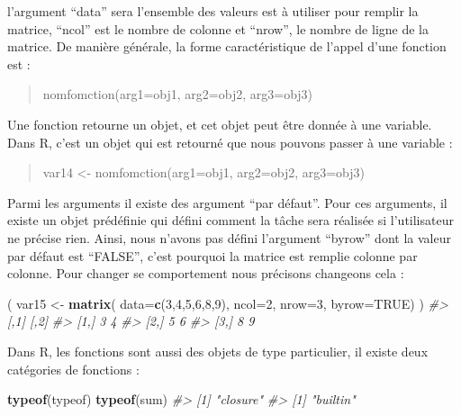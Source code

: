 \documentclass[]{article}
\newenvironment{Shaded}{\begin{snugshade}}{\end{snugshade}}
\newcommand{\CommentTok}[1]{\textcolor[rgb]{0.56,0.35,0.01}{\textit{#1}}}
\newcommand{\DataTypeTok}[1]{\textcolor[rgb]{0.13,0.29,0.53}{#1}}
\newcommand{\DecValTok}[1]{\textcolor[rgb]{0.00,0.00,0.81}{#1}}
\newcommand{\KeywordTok}[1]{\textcolor[rgb]{0.13,0.29,0.53}{\textbf{#1}}}
\newcommand{\NormalTok}[1]{#1}
\newcommand{\OtherTok}[1]{\textcolor[rgb]{0.56,0.35,0.01}{#1}}
\newcommand{\StringTok}[1]{\textcolor[rgb]{0.31,0.60,0.02}{#1}}
\begin{document}
l'argument ``data'' sera l'ensemble des valeurs est à utiliser pour remplir la matrice, ``ncol'' est le nombre de colonne et ``nrow'', le nombre de ligne de la matrice. De manière générale, la forme caractéristique de l'appel d'une fonction est :

\begin{quote}
nomfomction(arg1=obj1, arg2=obj2, arg3=obj3)
\end{quote}

Une fonction retourne un objet, et cet objet peut être donnée à une variable.
Dans R, c'est un objet qui est retourné que nous pouvons passer à une variable :

\begin{quote}
var14 \textless{}- nomfomction(arg1=obj1, arg2=obj2, arg3=obj3)
\end{quote}

Parmi les arguments il existe des argument ``par défaut''. Pour ces arguments, il existe un objet prédéfinie qui défini comment la tâche sera réalisée si l'utilisateur ne précise rien. Ainsi, nous n'avons pas défini l'argument ``byrow'' dont la valeur par défaut est ``FALSE'', c'est pourquoi la matrice est remplie colonne par colonne. Pour changer se comportement nous précisons changeons cela :

\begin{Shaded}
\begin{Highlighting}[]
\NormalTok{(}
\NormalTok{  var15 <-}\StringTok{ }\KeywordTok{matrix}\NormalTok{(}
    \DataTypeTok{data=}\KeywordTok{c}\NormalTok{(}\DecValTok{3}\NormalTok{,}\DecValTok{4}\NormalTok{,}\DecValTok{5}\NormalTok{,}\DecValTok{6}\NormalTok{,}\DecValTok{8}\NormalTok{,}\DecValTok{9}\NormalTok{),}
    \DataTypeTok{ncol=}\DecValTok{2}\NormalTok{,}
    \DataTypeTok{nrow=}\DecValTok{3}\NormalTok{,}
    \DataTypeTok{byrow=}\OtherTok{TRUE}\NormalTok{)}
\NormalTok{)}
\CommentTok{#>      [,1] [,2]}
\CommentTok{#> [1,]    3    4}
\CommentTok{#> [2,]    5    6}
\CommentTok{#> [3,]    8    9}
\end{Highlighting}
\end{Shaded}

Dans R, les fonctions sont aussi des objets de type particulier, il existe deux catégories de fonctions :

\begin{Shaded}
\begin{Highlighting}[]
\KeywordTok{typeof}\NormalTok{(typeof)}
\KeywordTok{typeof}\NormalTok{(sum)}
\CommentTok{#> [1] "closure"}
\CommentTok{#> [1] "builtin"}
\end{Highlighting}
\end{Shaded}
\end{document}
